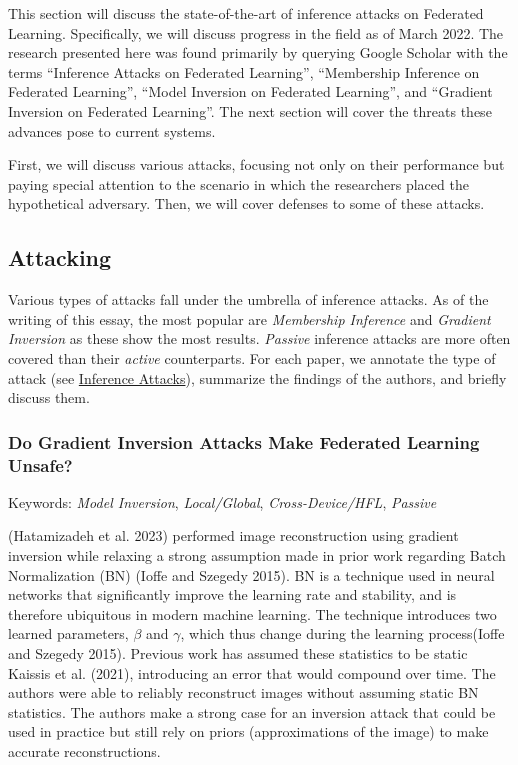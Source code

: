 This section will discuss the state-of-the-art of inference attacks on
Federated Learning. Specifically, we will discuss progress in the field
as of March 2022. The research presented here was found primarily by
querying Google Scholar with the terms ``Inference Attacks on Federated
Learning'', ``Membership Inference on Federated Learning'', ``Model
Inversion on Federated Learning'', and ``Gradient Inversion on Federated
Learning''. The next section will cover the threats these advances pose
to current systems.

First, we will discuss various attacks, focusing not only on their
performance but paying special attention to the scenario in which the
researchers placed the hypothetical adversary. Then, we will cover
defenses to some of these attacks.

\hypertarget{attacking}{%
\subsection{Attacking}\label{attacking}}

Various types of attacks fall under the umbrella of inference attacks.
As of the writing of this essay, the most popular are \emph{Membership
Inference} and \emph{Gradient Inversion} as these show the most results.
\emph{Passive} inference attacks are more often covered than their
\emph{active} counterparts. For each paper, we annotate the type of
attack (see \protect\hyperlink{inference-attacks}{Inference Attacks}),
summarize the findings of the authors, and briefly discuss them.

\hypertarget{do-gradient-inversion-attacks-make-federated-learning-unsafe}{%
\subsubsection{Do Gradient Inversion Attacks Make Federated Learning
Unsafe?}\label{do-gradient-inversion-attacks-make-federated-learning-unsafe}}

Keywords: \emph{Model Inversion}, \emph{Local/Global},
\emph{Cross-Device/HFL}, \emph{Passive}

(Hatamizadeh et al. 2023) performed image reconstruction using gradient
inversion while relaxing a strong assumption made in prior work
regarding Batch Normalization (BN) (Ioffe and Szegedy 2015). BN is a
technique used in neural networks that significantly improve the
learning rate and stability, and is therefore ubiquitous in modern
machine learning. The technique introduces two learned parameters,
\(\beta\) and \(\gamma\), which thus change during the learning
process(Ioffe and Szegedy 2015). Previous work has assumed these
statistics to be static Kaissis et al. (2021), introducing an error that
would compound over time. The authors were able to reliably reconstruct
images without assuming static BN statistics. The authors make a strong
case for an inversion attack that could be used in practice but still
rely on priors (approximations of the image) to make accurate
reconstructions.

